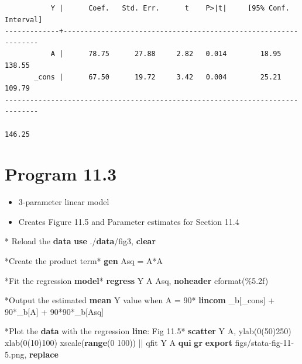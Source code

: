 \documentclass[
  10pt,
]{book}
\newenvironment{Shaded}{\begin{snugshade}}{\end{snugshade}}
\newcommand{\BaseNTok}[1]{\textcolor[rgb]{0.00,0.00,0.81}{#1}}
\newcommand{\DataTypeTok}[1]{\textcolor[rgb]{0.13,0.29,0.53}{#1}}
\newcommand{\KeywordTok}[1]{\textcolor[rgb]{0.13,0.29,0.53}{\textbf{#1}}}
\newcommand{\NormalTok}[1]{#1}
\newcommand{\OtherTok}[1]{\textcolor[rgb]{0.56,0.35,0.01}{#1}}
\providecommand{\tightlist}{%
  \setlength{\itemsep}{0pt}\setlength{\parskip}{0pt}}
\begin{document}
\begin{verbatim}
           Y |      Coef.   Std. Err.      t    P>|t|     [95% Conf. Interval]
-------------+----------------------------------------------------------------
           A |      78.75      27.88     2.82   0.014        18.95      138.55
       _cons |      67.50      19.72     3.42   0.004        25.21      109.79
------------------------------------------------------------------------------

146.25
\end{verbatim}

\hypertarget{program-11.3-1}{%
\section{Program 11.3}\label{program-11.3-1}}

\begin{itemize}
\tightlist
\item
  3-parameter linear model
\item
  Creates Figure 11.5 and Parameter estimates for Section 11.4
\end{itemize}

\begin{Shaded}
\begin{Highlighting}[]
\NormalTok{* Reload the }\KeywordTok{data}
\KeywordTok{use}\NormalTok{ ./}\KeywordTok{data}\NormalTok{/fig3, }\KeywordTok{clear}

\NormalTok{*Create the product term*}
\KeywordTok{gen}\NormalTok{ Asq = A*A}

\NormalTok{*Fit the regression }\KeywordTok{model}\NormalTok{*}
\KeywordTok{regress}\NormalTok{ Y A Asq, }\KeywordTok{noheader}\NormalTok{ cformat(\%5.2f)}

\NormalTok{*Output the estimated }\KeywordTok{mean}\NormalTok{ Y }\OtherTok{value}\NormalTok{ when A = 90*}
\KeywordTok{lincom}\NormalTok{ \_b[}\DataTypeTok{\_cons}\NormalTok{] + 90*\_b[A] + 90*90*\_b[Asq]}

\NormalTok{*Plot the }\KeywordTok{data}\NormalTok{ with the regression }\KeywordTok{line}\NormalTok{: Fig 11.5*}
\KeywordTok{scatter}\NormalTok{ Y A, ylab(0(50)250) xlab(0(10)100) }\BaseNTok{xscale}\NormalTok{(}\KeywordTok{range}\NormalTok{(0 100)) || qfit Y A}
\KeywordTok{qui} \KeywordTok{gr} \KeywordTok{export}\NormalTok{ figs/stata{-}fig{-}11{-}5.png, }\KeywordTok{replace}
\end{Highlighting}
\end{Shaded}
\end{document}
